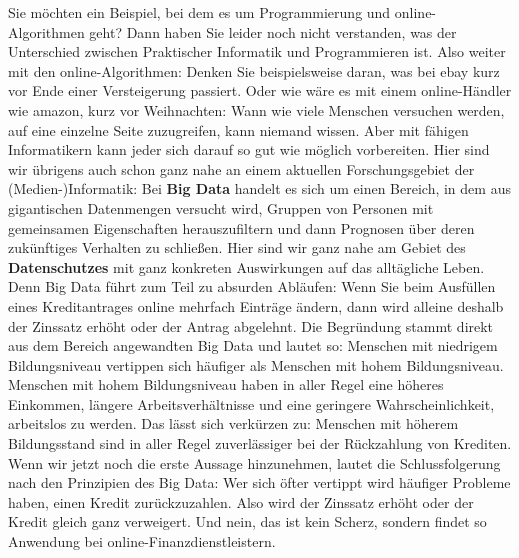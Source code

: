 Sie möchten ein Beispiel, bei dem es um Programmierung und online-\\
Algorithmen geht? Dann haben Sie leider noch nicht verstanden, was der Unterschied zwischen Praktischer Informatik und Programmieren ist. Also weiter mit den online-Algorithmen: Denken Sie beispielsweise daran, was bei ebay kurz vor Ende einer Versteigerung passiert. Oder wie wäre es mit einem online-Händler wie amazon, kurz vor Weihnachten: Wann wie viele Menschen versuchen werden, auf eine einzelne Seite zuzugreifen, kann niemand wissen. Aber mit fähigen Informatikern kann jeder sich darauf so gut wie möglich vorbereiten. Hier sind wir übrigens auch schon ganz nahe an einem aktuellen Forschungsgebiet der (Medien-)Informatik: Bei \textbf{Big Data} handelt es sich um einen Bereich, in dem aus gigantischen Datenmengen versucht wird, Gruppen von Personen mit gemeinsamen Eigenschaften herauszufiltern und dann Prognosen über deren zukünftiges Verhalten zu schließen. Hier sind wir ganz nahe am Gebiet des \textbf{Datenschutzes} mit ganz konkreten Auswirkungen auf das alltägliche Leben. Denn Big Data führt zum Teil zu absurden Abläufen: Wenn Sie beim Ausfüllen eines Kreditantrages online mehrfach Einträge ändern, dann wird alleine deshalb der Zinssatz erhöht oder der Antrag abgelehnt. Die Begründung stammt direkt aus dem Bereich angewandten Big Data und lautet so: Menschen mit niedrigem Bildungsniveau vertippen sich häufiger als Menschen mit hohem Bildungsniveau. Menschen mit hohem Bildungsniveau haben in aller Regel eine höheres Einkommen, längere Arbeitsverhältnisse und eine geringere Wahrscheinlichkeit, arbeitslos zu werden. Das lässt sich verkürzen zu: Menschen mit höherem Bildungsstand sind in aller Regel zuverlässiger bei der Rückzahlung von Krediten. Wenn wir jetzt noch die erste Aussage hinzunehmen, lautet die Schlussfolgerung nach den Prinzipien des Big Data: Wer sich öfter vertippt wird häufiger Probleme haben, einen Kredit zurückzuzahlen. Also wird der Zinssatz erhöht oder der Kredit gleich ganz verweigert. Und nein, das ist kein Scherz, sondern findet so Anwendung bei online-Finanzdienstleistern.\\

